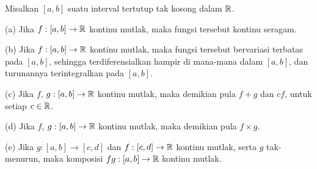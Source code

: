 
 Misalkan $[a,b]$ suatu interval tertutup tak kosong
dalam $\Bbb R$.

(a) Jika $f:[a,b]\to\Bbb R$ kontinu mutlak, maka fungsi tersebut kontinu seragam.

(b) Jika $f:[a,b]\to\Bbb R$ kontinu mutlak, maka fungsi tersebut bervariasi terbatas
pada $[a,b]$, sehingga terdiferensialkan hampir di mana-mana dalam
$[a,b]$, dan turunannya terintegralkan pada $[a,b]$.

(c) Jika $f$, $g:[a,b]\to\Bbb R$ kontinu mutlak, maka demikian pula $f+g$
dan $cf$, untuk setiap $c\in\Bbb R$.

(d) Jika $f$, $g:[a,b]\to\Bbb R$ kontinu mutlak, maka demikian pula
$f\times g$.

(e) Jika $g:[a,b]\to [c,d]$ dan $f:[c,d]\to\Bbb R$ kontinu mutlak, serta
$g$ tak-menurun, maka komposisi $fg:[a,b]\to\Bbb R$ kontinu mutlak.

